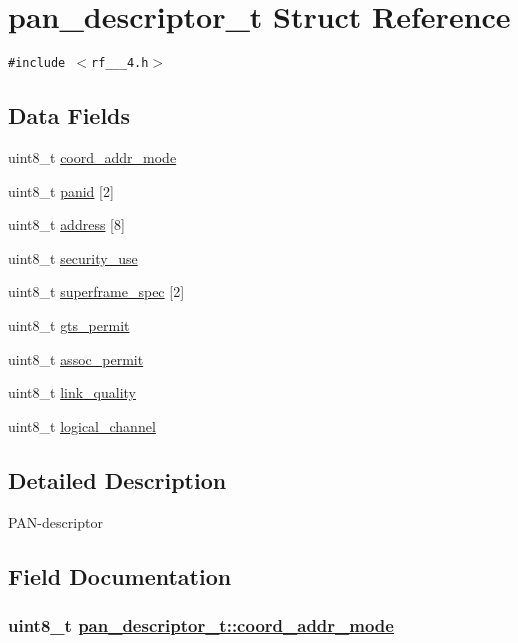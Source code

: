 \hypertarget{structpan__descriptor__t}{
\section{pan\_\-descriptor\_\-t Struct Reference}
\label{structpan__descriptor__t}
}
{\tt \#include $<$rf\_\_\_\-4.h$>$}

\subsection*{Data Fields}
\begin{CompactItemize}
\item 
uint8\_\-t \hyperlink{structpan__descriptor__t_1c8d355ca5d2215605090a65b15c4b76}{coord\_\-addr\_\-mode}
\item 
uint8\_\-t \hyperlink{structpan__descriptor__t_e94a30aedfc41b7ca0e551bd8928a3ab}{panid} \mbox{[}2\mbox{]}
\item 
uint8\_\-t \hyperlink{structpan__descriptor__t_06b11f6bb4786384c45457c81e9335e5}{address} \mbox{[}8\mbox{]}
\item 
uint8\_\-t \hyperlink{structpan__descriptor__t_d1f137dbd55028eaedf8ff0b444dfe25}{security\_\-use}
\item 
uint8\_\-t \hyperlink{structpan__descriptor__t_53f9ddb90f42af95b7a62d48c9a891a0}{superframe\_\-spec} \mbox{[}2\mbox{]}
\item 
uint8\_\-t \hyperlink{structpan__descriptor__t_0947e8dac75a8b36c19aa1c7d1af6e0f}{gts\_\-permit}
\item 
uint8\_\-t \hyperlink{structpan__descriptor__t_eaeabc250f8e65872e96b2b0d7b12061}{assoc\_\-permit}
\item 
uint8\_\-t \hyperlink{structpan__descriptor__t_07f083a4298ec06fd86e920ef3eb4a47}{link\_\-quality}
\item 
uint8\_\-t \hyperlink{structpan__descriptor__t_17a106035a332e15842bf81b5038a813}{logical\_\-channel}
\end{CompactItemize}


\subsection{Detailed Description}
PAN-descriptor 



\subsection{Field Documentation}
\hypertarget{structpan__descriptor__t_1c8d355ca5d2215605090a65b15c4b76}{
\subsubsection[coord\_\-addr\_\-mode]{\setlength{\rightskip}{0pt plus 5cm}uint8\_\-t \hyperlink{structpan__descriptor__t_1c8d355ca5d2215605090a65b15c4b76}{pan\_\-descriptor\_\-t::coord\_\-addr\_\-mode}}}
\label{structpan__descriptor__t_1c8d355ca5d2215605090a65b15c4b76}


